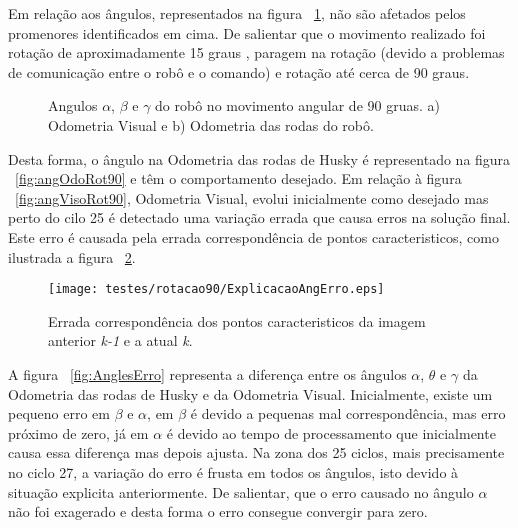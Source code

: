 Em relação aos ângulos, representados na figura ~\ref{fig:angRot90}, não são afetados pelos promenores identificados em cima. De salientar que o movimento realizado foi rotação de aproximadamente 15 graus , paragem na rotação (devido a problemas de comunicação entre o robô e o comando) e rotação até cerca de 90 graus. 


\begin{figure}[h!]
	\centering
	\qquad
	\caption{Angulos $\alpha$, $\beta$ e $\gamma$ do robô  no movimento angular de 90 gruas. a) Odometria Visual e b) Odometria das rodas do robô.}
	\label{fig:angRot90}
\end{figure}


Desta forma, o ângulo na Odometria das rodas de Husky é representado na figura ~\ref{fig:angOdoRot90} e têm o comportamento desejado. Em relação à figura ~\ref{fig:angVisoRot90}, Odometria Visual, evolui inicialmente como desejado mas perto do cilo 25 é detectado uma variação errada que causa erros na solução final. Este erro é causada pela errada correspondência de pontos caracteristicos, como ilustrada a figura ~\ref{fig:ExplicAngErr}. 


\begin{figure}[h!]
	\begin{center}
		\leavevmode		
		\texttt{[image: testes/rotacao90/ExplicacaoAngErro.eps]}
		\caption{Errada correspondência dos pontos caracteristicos da imagem anterior \textit{k-1} e a atual \textit{k}.}
		\label{fig:ExplicAngErr}
	\end{center}
\end{figure}


A figura ~\ref{fig:AnglesErro} representa a diferença entre os ângulos $\alpha$, $\theta$ e $\gamma$ da Odometria das rodas de Husky e da Odometria Visual. Inicialmente, existe um pequeno erro em $\beta$ e $\alpha$, em $\beta$ é devido a pequenas mal correspondência, mas erro próximo de zero, já em $\alpha$ é devido ao tempo de processamento que inicialmente causa essa diferença mas depois ajusta. Na zona dos 25 ciclos, mais precisamente no ciclo 27, a variação do erro é frusta em todos os ângulos, isto devido à situação explicita anteriormente. De salientar, que o erro causado no ângulo $\alpha$ não foi exagerado e desta forma o erro consegue convergir para zero.



